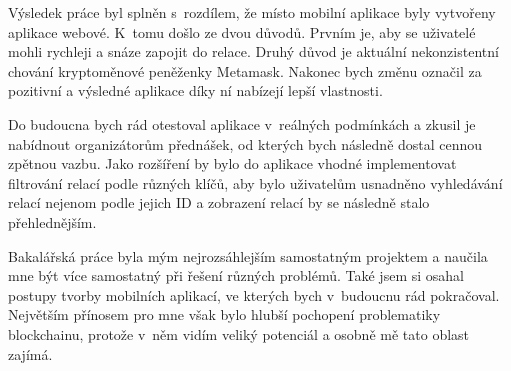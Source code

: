 Výsledek práce byl splněn s~rozdílem, že místo mobilní aplikace byly vytvořeny aplikace webové. K~tomu došlo ze dvou důvodů. Prvním je, aby se uživatelé mohli rychleji a snáze zapojit do relace. Druhý důvod je aktuální nekonzistentní chování kryptoměnové peněženky Metamask. Nakonec bych změnu označil za pozitivní a výsledné aplikace díky ní nabízejí lepší vlastnosti. 

Do budoucna bych rád otestoval aplikace v~reálných podmínkách a zkusil je nabídnout organizátorům přednášek, od kterých bych následně dostal cennou zpětnou vazbu. Jako rozšíření by bylo do aplikace vhodné implementovat filtrování relací podle různých klíčů, aby bylo uživatelům usnadněno vyhledávání relací nejenom podle jejich ID a zobrazení relací by se následně stalo přehlednějším. 

Bakalářská práce byla mým nejrozsáhlejším samostatným projektem a naučila mne být více samostatný při řešení různých problémů. Také jsem si osahal postupy tvorby mobilních aplikací, ve kterých bych v~budoucnu rád pokračoval. Největším přínosem pro mne však bylo hlubší pochopení problematiky blockchainu, protože v~něm vidím veliký potenciál a osobně mě tato oblast zajímá.

